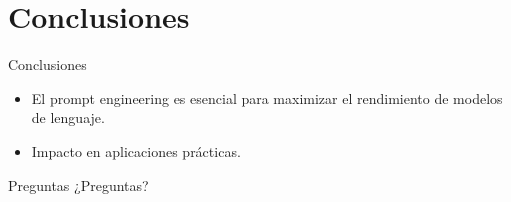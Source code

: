 \documentclass{beamer}
\begin{document}
\section{Conclusiones}
\begin{frame}{Conclusiones}
  \begin{itemize}
    \item El prompt engineering es esencial para maximizar el rendimiento de modelos de lenguaje.
    \item Impacto en aplicaciones prácticas.
  \end{itemize}
\end{frame}

\begin{frame}{Preguntas}
  \centering
  \Huge ¿Preguntas?
\end{frame}
\end{document}
